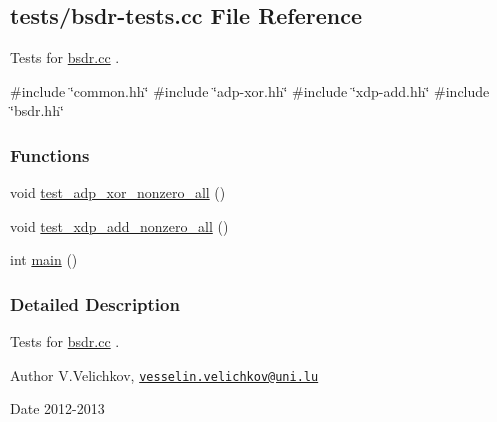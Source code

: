 \hypertarget{bsdr-tests_8cc}{\subsection{tests/bsdr-\/tests.cc \-File \-Reference}
\label{bsdr-tests_8cc}
}


\-Tests for \hyperlink{bsdr_8cc}{bsdr.\-cc} .  


{\ttfamily \#include \char`\"{}common.\-hh\char`\"{}}\*
{\ttfamily \#include \char`\"{}adp-\/xor.\-hh\char`\"{}}\*
{\ttfamily \#include \char`\"{}xdp-\/add.\-hh\char`\"{}}\*
{\ttfamily \#include \char`\"{}bsdr.\-hh\char`\"{}}\*
\subsubsection*{\-Functions}
\begin{DoxyCompactItemize}
\item 
void \hyperlink{bsdr-tests_8cc_aaaea695cbdec6ea9ce9d7c0416499d31}{test\-\_\-adp\-\_\-xor\-\_\-nonzero\-\_\-all} ()
\item 
void \hyperlink{bsdr-tests_8cc_aef6e6ab18d286c1a8c2455f1265a96c0}{test\-\_\-xdp\-\_\-add\-\_\-nonzero\-\_\-all} ()
\item 
int \hyperlink{bsdr-tests_8cc_ae66f6b31b5ad750f1fe042a706a4e3d4}{main} ()
\end{DoxyCompactItemize}


\subsubsection{\-Detailed \-Description}
\-Tests for \hyperlink{bsdr_8cc}{bsdr.\-cc} . \begin{DoxyAuthor}{\-Author}
\-V.\-Velichkov, \href{mailto:vesselin.velichkov@uni.lu}{\tt vesselin.\-velichkov@uni.\-lu} 
\end{DoxyAuthor}
\begin{DoxyDate}{\-Date}
2012-\/2013 
\end{DoxyDate}


